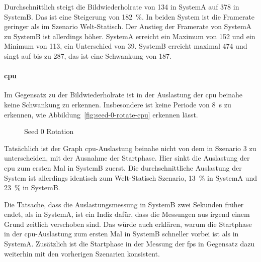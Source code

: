 Durchschnittlich steigt die Bildwiederholrate von \SI{134}{\fps} in SystemA auf \SI{378}{\fps} in SystemB. Das ist eine Steigerung von \SI{182}{\percent}. In beiden System ist die Framerate geringer als im Szenario Welt-Statisch. Der Anstieg der Framerate von SystemA zu SystemB ist allerdings höher. SystemA erreicht ein Maximum von \SI{152}{\fps} und ein Minimum von \SI{113}{\fps}, ein Unterschied von \SI{39}{\fps}. SystemB erreicht maximal \SI{474}{\fps} und singt auf bis zu \SI{287}{\fps}, das ist eine Schwankung von \SI{187}{\fps}.

\paragraph{\ac{cpu}}
Im Gegensatz zu der Bildwiederholrate ist in der Auslastung der \ac{cpu} beinahe keine Schwankung zu erkennen. Insbesondere ist keine Periode von \SI{8}{\second} zu erkennen, wie Abbildung~\vref{fig:seed-0-rotate-cpu} erkennen lässt.
\begin{figure}[!htbp]
	\caption{Seed 0 Rotation}\label{fig:seed-0-rotate-cpu}
\end{figure}
Tatsächlich ist der Graph \ac{cpu}-Auslastung beinahe nicht von dem in Szenario 3 zu unterscheiden, mit der Ausnahme der Startphase. Hier sinkt die Auslastung der \ac{cpu} zum ersten Mal in SystemB zuerst. Die durchschnittliche Auslastung der System ist allerdings identisch zum Welt-Statisch Szenario, \SI{13}{\percent} in SystemA und \SI{23}{\percent} in SystemB.

Die Tatsache, dass die Auslastungsmessung in SystemB zwei Sekunden früher endet, als in SystemA, ist ein Indiz dafür, dass die Messungen aus irgend einem Grund zeitlich verschoben sind. Das würde auch erklären, warum die Startphase in der \ac{cpu}-Auslastung zum ersten Mal in SystemB schneller vorbei ist als in SystemA. Zusätzlich ist die Startphase in der Messung der \ac{fps} in Gegensatz dazu weiterhin mit den vorherigen Szenarien konsistent. 

